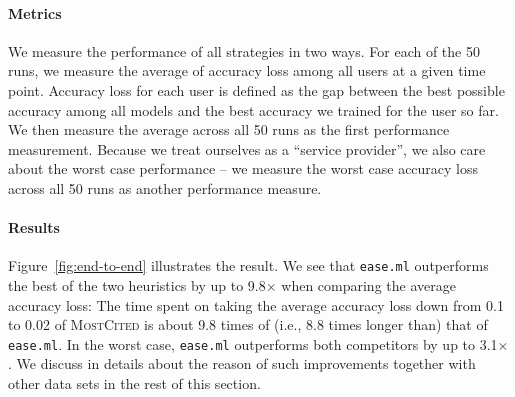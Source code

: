\documentclass[letterpaper]{vldb}
\newcommand{\eml}{\texttt{ease.ml}\xspace}
\begin{document}
\vspace{-1em}
\paragraph*{Metrics} We measure the performance
of all strategies in two ways.
For each of the 50 runs, we
measure the average of accuracy loss
among all users at a given time
point. Accuracy loss for each user
is defined as the gap between
the best possible accuracy among all
models and the best accuracy we
trained for the user so far. We
then measure the average across
all 50 runs as the first performance
measurement. Because
we treat ourselves as a ``service provider'',
we also care about the worst case
performance -- we measure the
worst case accuracy loss 
across all 50 runs as another performance
measure.

\vspace{-1em}
\paragraph*{Results} Figure~\ref{fig:end-to-end}
illustrates the result.
We see that \eml outperforms the best of the two heuristics by up to 9.8$\times$ when comparing the average accuracy loss: The time spent on taking the average accuracy loss down from 0.1 to 0.02 of \textsc{MostCited} is about 9.8 times of (i.e., 8.8 times longer than) that of \eml.
In the worst case, \eml outperforms 
both competitors by up to 3.1$\times$.
We discuss in details about the reason of
such improvements together with other data
sets in the rest of this section.
\end{document}
